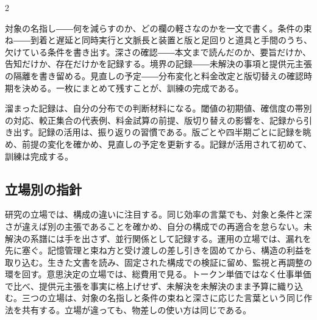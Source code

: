 \documentclass[lualatex,a4paper,10pt]{jlreq}
\begin{document}
\begin{multicols}{2}
\begin{themeoverview}[記録用紙の雛形]
対象の名指し――何を減らすのか、どの欄の軽さなのかを一文で書く。条件の束ね――到着と遅延と同時実行と文脈長と装置と版と足回りと道具と手間のうち、欠けている条件を書き出す。深さの確認――本文まで読んだのか、要旨だけか、告知だけか、存在だけかを記録する。境界の記録――未解決の事項と提供元主張の隔離を書き留める。見直しの予定――分布変化と料金改定と版切替えの確認時期を決める。一枚にまとめて残すことが、訓練の完成である。
\end{themeoverview}

\begin{themeoverview}[記録の活用]
溜まった記録は、自分の分布での判断材料になる。閾値の初期値、確信度の帯別の対応、較正集合の代表例、料金試算の前提、版切り替えの影響を、記録から引き出す。記録の活用は、振り返りの習慣である。版ごとや四半期ごとに記録を眺め、前提の変化を確かめ、見直しの予定を更新する。記録が活用されて初めて、訓練は完成する。
\end{themeoverview}

\subsection{立場別の指針}
研究の立場では、構成の違いに注目する。同じ効率の言葉でも、対象と条件と深さが違えば別の主張であることを確かめ、自分の構成での再適合を怠らない。未解決の系譜には手を出さず、並行関係として記録する。運用の立場では、漏れを先に塞ぐ。記憶管理と束ね方と受け渡しの差し引きを固めてから、構造の利益を取り込む。生きた文書を読み、固定された構成での検証に留め、監視と再調整の環を回す。意思決定の立場では、総費用で見る。トークン単価ではなく仕事単価で比べ、提供元主張を事実に格上げせず、未解決を未解決のまま予算に織り込む。三つの立場は、対象の名指しと条件の束ねと深さに応じた言葉という同じ作法を共有する。立場が違っても、物差しの使い方は同じである。
\end{multicols}
\end{document}

